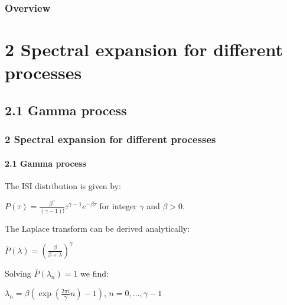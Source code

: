 \documentclass{beamer}
\begin{document}
\begin{frame}
\frametitle{Overview}%
\tableofcontents %
\end{frame}

\section{2 Spectral expansion for different processes}

\subsection{2.1 Gamma process}
\begin{frame}
\frametitle{2 Spectral expansion for different processes}
\framesubtitle{2.1 Gamma process}

The ISI distribution is given by: 	

\vspace{0.2cm}
\hspace{2.5cm}$P(\tau)=\frac{\beta^\gamma}{(\gamma-1)!}\tau^{\gamma-1}e^{-\beta\tau}$ for integer $\gamma$ and $\beta>0$. 

\pause
\vspace{0.3cm}
The Laplace transform can be derived analytically:

\vspace{0.2cm}
\hspace{2.5cm}$\bar{P}(\lambda)=(\frac{\beta}{\beta+\lambda})^\gamma$

\pause
\vspace{0.3cm}
Solving $\bar{P}(\lambda_n)=1$ we find:

\vspace{0.2cm}
\hspace{2.8cm} $\lambda_n=\beta(\exp(\frac{2\pi i}{\gamma}n)-1)$, $n=0,..., \gamma-1$

\end{frame}
\end{document}
